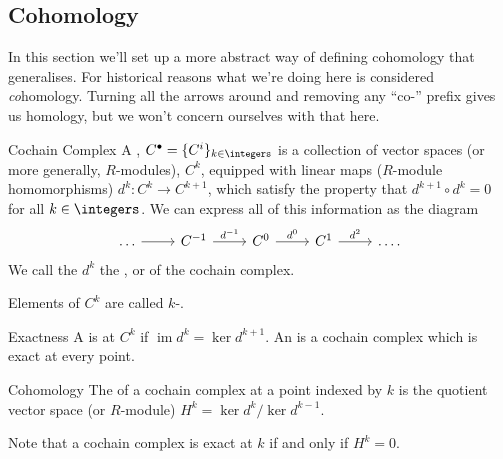 \documentclass[fleqn]{NotesClass}
\DeclareMathOperator{\im}{im}
\begin{document}
    \subsection{Cohomology}
    In this section we'll set up a more abstract way of defining cohomology that generalises.
    For historical reasons what we're doing here is considered \emph{co}homology.
    Turning all the arrows around and removing any \enquote{co-} prefix gives us homology, but we won't concern ourselves with that here.
    
    \begin{dfn}{Cochain Complex}{}
        A , \(C^{\bullet} = \{C^i\}_{k \in \integers}\) is a collection of vector spaces (or more generally, \(R\)-modules), \(C^k\), equipped with linear maps (\(R\)-module homomorphisms) \(d^k \colon C^k \to C^{k+1}\), which satisfy the property that \(d^{k + 1} \circ d^{k} = 0\) for all \(k \in \integers\).
        We can express all of this information as the diagram
        \begin{equation}
                \begin{tikzcd}
                    \dots \arrow[r] & C^{-1} \arrow[r, "d^{-1}"] & C^0 \arrow[r, "d^0"] & C^1 \arrow[r, "d^2"] & \dots.
                \end{tikzcd}
        \end{equation}
        We call the \(d^k\) the , or  of the cochain complex.
        
        Elements of \(C^k\) are called \(k\)-.
    \end{dfn}
    
    \begin{dfn}{Exactness}{}
        A  is  at \(C^k\) if \(\im d^{k} = \ker d^{k+1}\).
        An  is a cochain complex which is exact at every point.
    \end{dfn}
    
    \begin{dfn}{Cohomology}{}
        The  of a cochain complex at a point indexed by \(k\) is the quotient vector space (or \(R\)-module) \(H^k = \ker d^k/\ker d^{k-1}\).
    \end{dfn}
    
    Note that a cochain complex is exact at \(k\) if and only if \(H^k = 0\).
    
\end{document}
